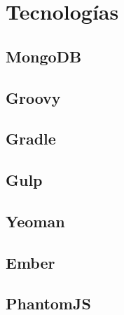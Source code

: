 \clearpage
\section{Tecnologías}
\subsection{MongoDB}
\subsection{Groovy}
\subsection{Gradle}
\subsection{Gulp}
\subsection{Yeoman}
\subsection{Ember}
\subsection{PhantomJS}
